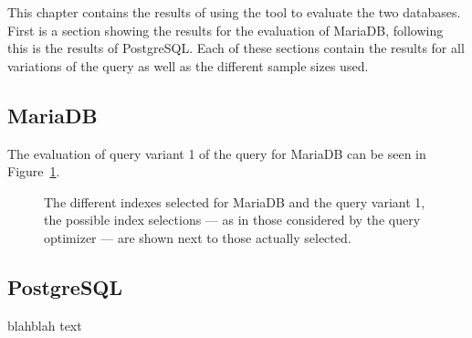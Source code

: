 This chapter contains the results of using the tool to evaluate the two
databases. First is a section showing the results for the evaluation of MariaDB,
following this is the results of PostgreSQL. Each of these sections contain the
results for all variations of the query as well as the different sample sizes used.

\subsection{MariaDB}
The evaluation of query variant 1 of the query for MariaDB can be seen in
Figure~\ref{fig:plot:mariadb:query1}.

\begin{figure}
\caption[The index selections for MariaDB and query variant 1.]{The different
  indexes selected for MariaDB and the query variant 1, the possible index
  selections --- as in those considered by the query optimizer --- are shown next to
those actually selected.}\label{fig:plot:mariadb:query1}
\end{figure}

\subsection{PostgreSQL}
blahblah text